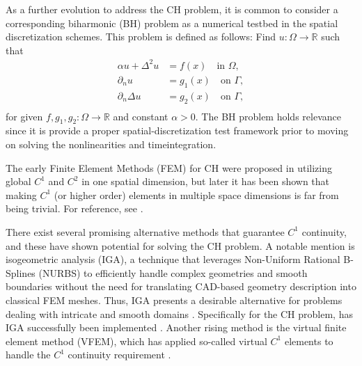 \documentclass[11pt]{article}
\theoremstyle{remark}
\numberwithin{equation}{section}
\begin{document}
As a further evolution to address the CH problem, it is common to consider a corresponding biharmonic (BH) problem as a numerical testbed in the spatial discretization schemes. This problem is defined as follows: Find $u:\Omega \to \mathbb{R}   $
such that
\begin{equation}
\label{eq:BH-problem}
\begin{split}
    \alpha u + \Delta ^2 u  & = f( x) \quad \text{in }  \Omega, \\
    \partial _{n} u & = g_{1}( x)  \quad \text{on } \Gamma,   \\
    \partial _{n} \Delta  u & = g_{2}( x)  \quad \text{on } \Gamma,   \\
\end{split}
\end{equation}
for given $f,g_{1} ,g_{2}: \Omega  \to \mathbb{R} $ and constant $\alpha >0  $.
The BH problem holds relevance since it is provide a proper spatial-discretization test framework prior to moving on solving the nonlinearities and timeintegration.

The early Finite Element Methods (FEM) for CH were proposed in \cite{elliott1987numerical, elliott1986cahn} utilizing global $C^{1}$ and $C^{2}$ in one spatial dimension, but later it has been shown that making $C^{1}$ (or higher order) elements in
multiple space dimensions is far from being trivial. For
reference, see \cite{kapl2021family, percell1976cubic, argyris1968tuba}.

There exist several promising alternative methods that guarantee $C^{1}$ continuity, and these have shown potential for solving the CH problem. A notable mention is isogeometric analysis (IGA), a technique that leverages Non-Uniform
Rational B-Splines (NURBS) to efficiently handle complex geometries and smooth boundaries without the need for translating CAD-based geometry description into classical FEM meshes. Thus, IGA presents a desirable alternative for problems dealing with intricate and smooth domains
\cite{hughes2005isogeometric}. Specifically for the CH problem, has IGA successfully been implemented \cite{kastner2016isogeometric, gomez2008isogeometric}.
Another rising method is the virtual finite element method (VFEM), which has applied so-called virtual $C^{1}$ elements to handle the $C^{1}$ continuity requirement \cite{antonietti2016c}.
\end{document}

